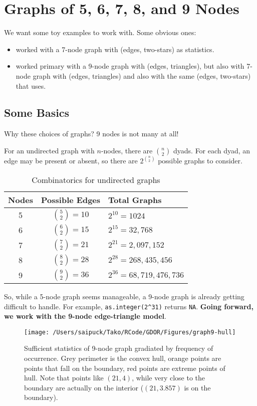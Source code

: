\documentclass{amsbook}
\theoremstyle{definition}
\theoremstyle{remark}
\begin{document}
\newpage
\section{Graphs of 5, 6, 7, 8, and 9 Nodes}
We want some toy examples to work with.  Some obvious ones:
\begin{itemize}
\item \citet{Handcock:Degeneracy} worked with a 7-node graph with (edges, two-stars) as 
statistics.
\item \citet{Rinaldo:2009} worked primary with a 9-node graph with (edges, triangles), 
but also with 7-node graph with (edges, triangles) and also with the same (edges, two-stars) that \citet{Handcock:Degeneracy} uses.
\end{itemize}

\subsection{Some Basics}
Why these choices of graphs?  9 nodes is not many at all!

For an undirected graph with $n$-nodes, there are $n \choose 2$ dyads.  For each dyad, 
an edge may be present or absent, so there are $2^{n \choose 2}$ possible graphs to 
consider.\\

\begin{table}[ht]
\caption{Combinatorics for undirected graphs}
\begin{tabular}{ccl}
\hline 
Nodes & Possible Edges & Total Graphs \\ [1ex]
\hline
5 & ${5 \choose 2} = 10$ & $2^{10} = 1024$ \\ [1ex]
6 & ${6 \choose 2} = 15$ & $2^{15} = 32,768$ \\ [1ex]
7 & ${7 \choose 2} = 21$ & $2^{21} = 2,097,152$ \\ [1ex]
8 & ${8 \choose 2} = 28$ & $2^{28} = 268,435,456$ \\ [1ex]
9 & ${9 \choose 2} = 36$ & $2^{36} = 68,719,476,736$ \\ [1ex]
\hline 
\end{tabular}
\end{table}

So, while a 5-node graph seems manageable, a 9-node graph is already getting difficult 
to handle.  For example, \texttt{as.integer(2\textasciicircum31)} returns \texttt{NA}.  
\textbf{Going forward, we work with the 9-node edge-triangle model}.

\begin{figure}[!h]
\centering
\texttt{[image: /Users/saipuck/Tako/RCode/GDOR/Figures/graph9-hull]}
\caption{Sufficient statistics of 9-node graph gradiated by frequency of occurrence.  
Grey perimeter is the convex hull, orange points are points that fall on the boundary, 
red points are extreme points of hull.  
Note that points like $(21,4)$, while very close to the boundary are actually on the 
interior ($(21, 3.857)$ is on the boundary).
}
\end{figure}
\end{document}
